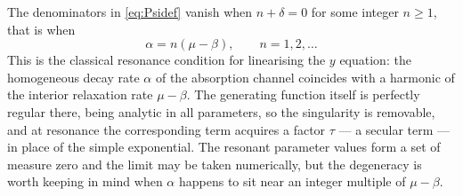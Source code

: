 \begin{remark}[Resonance]
\label{rem:resonance}
The denominators in \cref{eq:Psidef} vanish when $n+\delta=0$ for some integer $n\ge1$,
that is when
\begin{equation*}
\alpha = n(\mu-\beta),\qquad n=1,2,\dots
\end{equation*}
This is the classical resonance condition for linearising the $y$ equation: the homogeneous
decay rate $\alpha$ of the absorption channel coincides with a harmonic of the interior
relaxation rate $\mu-\beta$. The generating function itself is perfectly regular there, being
analytic in all parameters, so the singularity is removable, and at resonance the
corresponding term acquires a factor $\tau$ --- a secular term --- in place of the simple
exponential. The resonant parameter values form a set of measure zero and the limit may be
taken numerically, but the degeneracy is worth keeping in mind when $\alpha$ happens to sit
near an integer multiple of $\mu-\beta$.
\end{remark}

\FloatBarrier
